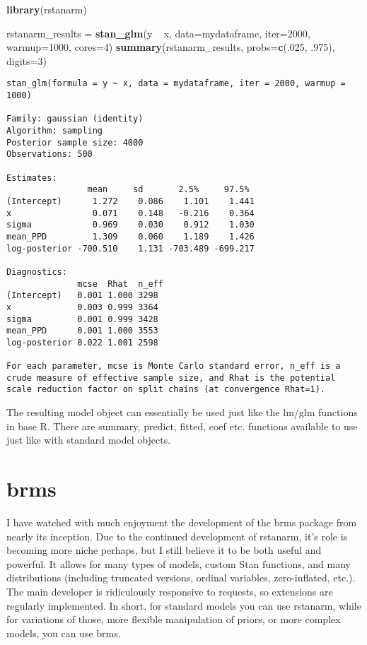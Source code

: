 \documentclass[]{book}
\newenvironment{Shaded}{\begin{snugshade}}{\end{snugshade}}
\newcommand{\KeywordTok}[1]{\textcolor[rgb]{0.13,0.29,0.53}{\textbf{{#1}}}}
\newcommand{\DataTypeTok}[1]{\textcolor[rgb]{0.13,0.29,0.53}{{#1}}}
\newcommand{\DecValTok}[1]{\textcolor[rgb]{0.00,0.00,0.81}{{#1}}}
\newcommand{\StringTok}[1]{\textcolor[rgb]{0.31,0.60,0.02}{{#1}}}
\newcommand{\NormalTok}[1]{{#1}}
\begin{document}
\begin{Shaded}
\begin{Highlighting}[]
\KeywordTok{library}\NormalTok{(rstanarm)}

\NormalTok{rstanarm_results =}\StringTok{ }\KeywordTok{stan_glm}\NormalTok{(y ~}\StringTok{ }\NormalTok{x, }\DataTypeTok{data=}\NormalTok{mydataframe, }\DataTypeTok{iter=}\DecValTok{2000}\NormalTok{, }\DataTypeTok{warmup=}\DecValTok{1000}\NormalTok{, }\DataTypeTok{cores=}\DecValTok{4}\NormalTok{)}
\KeywordTok{summary}\NormalTok{(rstanarm_results, }\DataTypeTok{probs=}\KeywordTok{c}\NormalTok{(.}\DecValTok{025}\NormalTok{, .}\DecValTok{975}\NormalTok{), }\DataTypeTok{digits=}\DecValTok{3}\NormalTok{)}
\end{Highlighting}
\end{Shaded}

\begin{verbatim}
stan_glm(formula = y ~ x, data = mydataframe, iter = 2000, warmup = 1000)

Family: gaussian (identity)
Algorithm: sampling
Posterior sample size: 4000
Observations: 500

Estimates:
                mean     sd       2.5%     97.5% 
(Intercept)      1.272    0.086    1.101    1.441
x                0.071    0.148   -0.216    0.364
sigma            0.969    0.030    0.912    1.030
mean_PPD         1.309    0.060    1.189    1.426
log-posterior -700.510    1.131 -703.489 -699.217

Diagnostics:
              mcse  Rhat  n_eff
(Intercept)   0.001 1.000 3298 
x             0.003 0.999 3364 
sigma         0.001 0.999 3428 
mean_PPD      0.001 1.000 3553 
log-posterior 0.022 1.001 2598 

For each parameter, mcse is Monte Carlo standard error, n_eff is a crude measure of effective sample size, and Rhat is the potential scale reduction factor on split chains (at convergence Rhat=1).
\end{verbatim}

The resulting model object can essentially be used just like the
{lm}/{glm} functions in base R. There are {summary}, {predict},
{fitted}, {coef} etc. functions available to use just like with standard
model objects.

\section{brms}\label{brms}

I have watched with much enjoyment the development of the {brms} package
from nearly its inception. Due to the continued development of
{rstanarm}, it's role is becoming more niche perhaps, but I still
believe it to be both useful and powerful. It allows for many types of
models, custom Stan functions, and many distributions (including
truncated versions, ordinal variables, zero-inflated, etc.). The main
developer is ridiculously responsive to requests, so extensions are
regularly implemented. In short, for standard models you can use
{rstanarm}, while for variations of those, more flexible manipulation of
priors, or more complex models, you can use {brms}.
\end{document}
